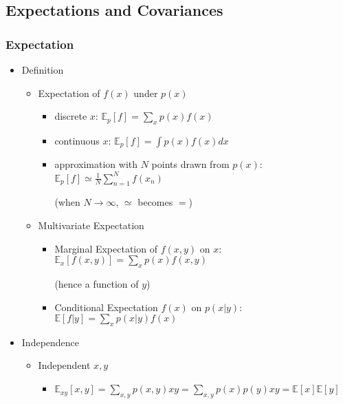 \subsection{Expectations and Covariances}

\subsubsection{Expectation}

\begin{itemize}
\item Definition
	\begin{itemize}
	\item Expectation of $f(x)$ under $p(x)$
		\begin{itemize}
		\item discrete $x$: $\displaystyle \mathbb{E}_{p}[f] = \sum_xp(x)f(x)$
		\item continuous $x$: $\displaystyle \mathbb{E}_{p}[f] = \int p(x)f(x)dx$
		\item approximation with $N$ points drawn from $p(x)$: $\displaystyle \mathbb E_p[f] \simeq \frac 1N \sum_{n=1}^N f(x_n) $
		
		(when $N\rightarrow \infty$, $\simeq$ becomes $=$)
		\end{itemize}
	\item Multivariate Expectation
		\begin{itemize}
		\item Marginal Expectation of $f(x,y)$ on $x$: $\displaystyle \mathbb{E}_x[f(x,y)] = \sum_xp(x)f(x,y)$ 
		
		(hence a function of $y$)
		\item Conditional Expectation $f(x)$ on $p(x|y)$: $\displaystyle \mathbb{E}[f|y] = \sum_x p(x|y)f(x)$
		\end{itemize}
	\end{itemize}
\item Independence
	\begin{itemize}
	\item Independent $x,y$
		\begin{itemize}
		\item $\displaystyle \mathbb{E}_{xy}[x,y] = \sum_{x,y}p(x,y)xy = \sum_{x,y}p(x)p(y)xy = \mathbb{E}[x]\mathbb{E}[y]$
		\end{itemize}
	\end{itemize}
\end{itemize}

